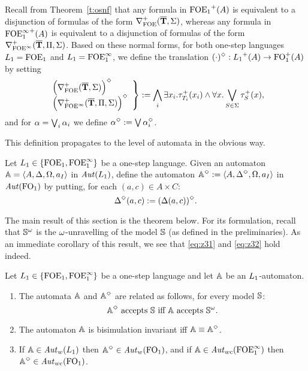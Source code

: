 \begin{definition}
Recall from Theorem~\ref{t:osnf} that any formula in ${\mathrm{FOE}_1}^+(A)$ is 
equivalent to a disjunction of formulas of the form 
$\nabla^+_{\mathrm{FOE}}(\overline{{\mathbf{T}}},\Sigma)$, whereas any formula in ${\mathrm{FOE}^{\infty}_1}^+(A)$ is 
equivalent to a disjunction of formulas of the form 
$\nabla^+_{{\mathrm{FOE}}^\infty}(\overline{{\mathbf{T}}},\Pi,\Sigma)$. 
Based on these normal forms, for both one-step languages $L_{1}={\mathrm{FOE}_1}$ and 
$L_{1}={\mathrm{FOE}^{\infty}_1}$, we define the translation 
$(\cdot)^{\Diamond} : {L_{1}}^+(A) \to \mathrm{FO}_1^+(A)$ by setting
\[
\left.\begin{array}{l}
   \Big( \nabla^+_{\mathrm{FOE}}(\overline{{\mathbf{T}}},\Sigma) \Big)^{\Diamond} 
\\ \Big( \nabla^+_{{\mathrm{FOE}}^\infty}(\overline{{\mathbf{T}}},\Pi,\Sigma) \Big)^{\Diamond} 
\end{array}\right\}
\mathrel{: =} \bigwedge_{i} \exists x_i. \tau^+_{T_i}(x_i) \land 
\forall x. \bigvee_{S\in\Sigma} \tau^+_S(x),
\]
and for $\alpha = \bigvee_{i} \alpha_{i}$ we define $\alpha^{\Diamond} \mathrel{: =} \bigvee 
\alpha_{i}^{\Diamond}$.
\end{definition}

\noindent
This definition propagates to the level of automata in the obvious way.

\begin{definition}
Let $L_{1}\in \{{\mathrm{FOE}_1},{\mathrm{FOE}^{\infty}_1}\}$ be a one-step language.
Given an automaton $\mathbb{A} = \langle{A,\Delta,\Omega,a_{I}}\rangle$ in $\mathit{Aut}(L_{1})$, define 
the automaton $\mathbb{A}^{\Diamond} \mathrel{: =} \langle{A,\Delta^{\Diamond},\Omega,a_{I}}\rangle$ in 
$\mathit{Aut}(\mathrm{FO}_1)$ by putting, for each $(a,c) \in A \times C$:
\[
\Delta^{\Diamond}(a,c) \mathrel{: =} (\Delta(a,c))^{\Diamond}.
\]
\end{definition}

The main result of this section is the theorem below.
For its formulation, recall that $\mathbb{S}^{\omega}$ is the $\omega$-unravelling of 
the model $\mathbb{S}$ (as defined in the preliminaries).
As an immediate corollary of this result, we see that \eqref{eq:z31} and
\eqref{eq:z32} hold indeed.

\begin{theorem}
\label{t:bi-aut}
Let $L_{1}\in \{{\mathrm{FOE}_1},{\mathrm{FOE}^{\infty}_1}\}$ be a one-step language and let $\mathbb{A}$ be an
$L_{1}$-automaton.

\begin{enumerate}
\item
The automata $\mathbb{A}$ and $\mathbb{A}^{\Diamond}$ are related as follows, for every model $\mathbb{S}$:
\begin{equation}
\label{eq:crux}
\bbA^{\tmod} \text{ accepts } \bbS \text{ iff } \bbA \text{ accepts
} \bbS^{\om}.
\end{equation}
\item
The automaton $\mathbb{A}$ is bisimulation invariant iff $\mathbb{A} \equiv \mathbb{A}^{\Diamond}$.
\item
If $\mathbb{A}\in \mathit{Aut}_{w}(L_{1})$ then $\mathbb{A}^{\Diamond}\in \mathit{Aut}_{w}(\mathrm{FO}_1)$, and 
if $\mathbb{A}\in \mathit{Aut}_{wc}(\mathrm{FOE}^{\infty}_1)$ then $\mathbb{A}^{\Diamond}\in \mathit{Aut}_{wc}(\mathrm{FO}_1)$.
\end{enumerate}
\end{theorem}


